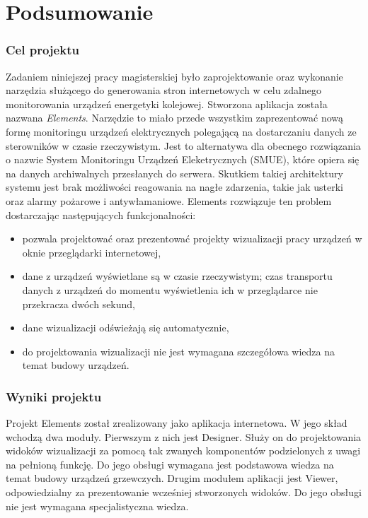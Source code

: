\chapter{Podsumowanie}

\subsection{Cel projektu}
Zadaniem niniejszej pracy magisterskiej było zaprojektowanie oraz wykonanie narzędzia służącego do generowania stron internetowych w celu zdalnego monitorowania urządzeń energetyki kolejowej. Stworzona aplikacja została nazwana \textit{Elements}. Narzędzie to miało przede wszystkim zaprezentować nową formę monitoringu urządzeń elektrycznych polegającą na dostarczaniu danych ze sterowników w czasie rzeczywistym. Jest to alternatywa dla obecnego rozwiązania o nazwie System Monitoringu Urządzeń Eleketrycznych (SMUE), które opiera się na danych archiwalnych przesłanych do serwera. Skutkiem takiej architektury systemu jest brak możliwości reagowania na nagłe zdarzenia, takie jak usterki oraz alarmy pożarowe i antywłamaniowe. Elements rozwiązuje ten problem dostarczając następujących funkcjonalności:
\begin{itemize}
\item pozwala projektować oraz prezentować projekty wizualizacji pracy urządzeń w oknie przeglądarki internetowej,
\item dane z urządzeń wyświetlane są w czasie rzeczywistym; czas transportu danych z urządzeń do momentu wyświetlenia ich w przeglądarce nie przekracza dwóch sekund,
\item dane wizualizacji odświeżają się automatycznie,
\item do projektowania wizualizacji nie jest wymagana szczegółowa wiedza na temat budowy urządzeń.
\end{itemize}


\subsection{Wyniki projektu}
Projekt Elements został zrealizowany jako aplikacja internetowa. W jego skład wchodzą dwa moduły. Pierwszym z nich jest Designer. Służy on do projektowania widoków wizualizacji za pomocą tak zwanych komponentów podzielonych z uwagi na pełnioną funkcję. Do jego obsługi wymagana jest podstawowa wiedza na temat budowy urządzeń grzewczych. Drugim modułem aplikacji jest Viewer, odpowiedzialny za prezentowanie wcześniej stworzonych widoków. Do jego obsługi nie jest wymagana specjalistyczna wiedza.

